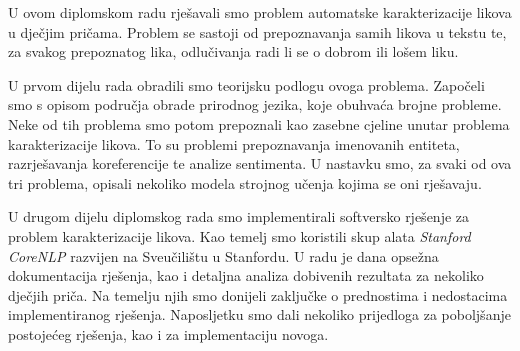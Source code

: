 \documentclass[a4paper,twoside,12pt]{memoir} %
\newcommand{\ti}[1]{\textit{#1\/}}
\begin{document}
\pagestyle{empty} %


\begin{sazetak}

	U ovom diplomskom radu rješavali smo problem automatske karakterizacije likova u dječjim pričama. Problem se sastoji od prepoznavanja samih likova u tekstu te, za svakog prepoznatog lika, odlučivanja radi li se o dobrom ili lošem liku.

	U prvom dijelu rada obradili smo teorijsku podlogu ovoga problema. Započeli smo s opisom područja obrade prirodnog jezika, koje obuhvaća brojne probleme. Neke od tih problema smo potom prepoznali kao zasebne cjeline unutar problema karakterizacije likova. To su problemi prepoznavanja imenovanih entiteta, razrješavanja koreferencije te analize sentimenta. U nastavku smo, za svaki od ova tri problema, opisali nekoliko modela strojnog učenja kojima se oni rješavaju.

	U drugom dijelu diplomskog rada smo implementirali softversko rješenje za problem karakterizacije likova. Kao temelj smo koristili skup alata \ti{Stanford CoreNLP} razvijen na Sveučilištu u Stanfordu. U radu je dana opsežna dokumentacija rješenja, kao i detaljna analiza dobivenih rezultata za nekoliko dječjih priča. Na temelju njih smo donijeli zaključke o prednostima i nedostacima implementiranog rješenja. Naposljetku smo dali nekoliko prijedloga za poboljšanje postojećeg rješenja, kao i za implementaciju novoga.

\end{sazetak}
\end{document}

